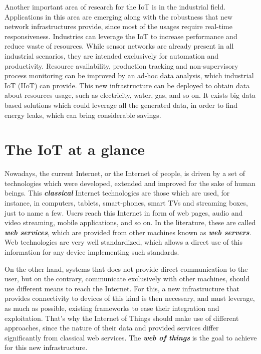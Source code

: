 Another important area of research for the IoT is in the industrial field\cite{lidaxu2014iiotsurvey}.
Applications in this area are emerging along with the robustness that new network infrastructures provide, since most of the usages require real-time responsiveness.
Industries can leverage the IoT to increase performance and reduce waste of resources.
While sensor networks are already present in all industrial scenarios, they are intended exclusively for automation and productivity.
Resource availability, production tracking and non-supervisory process monitoring can be improved by an ad-hoc data analysis, which industrial IoT (IIoT) can provide.
This new infrastructure can be deployed to obtain data about resources usage, such as electricity, water, gas, and so on.
It exists big data based solutions which could leverage all the generated data, in order to find energy leaks, which can bring considerable savings. 



\section{The IoT at a glance}
Nowadays, the current Internet, or the Internet of people, is driven by a set of technologies which were developed, extended and improved for the sake of human beings.
This \textit{\textbf{classical}} Internet technologies are those which are used, for instance, in computers, tablets, smart-phones, smart TVs and streaming boxes, just to name a few.
Users reach this Internet in form of web pages, audio and video streaming, mobile applications, and so on.
In the literature, these are called \textit{\textbf{web services}}, which are provided from other machines known as \textit{\textbf{web servers}}.
Web technologies are very well standardized, which allows a direct use of this information for any device implementing such standards.

On the other hand, systems that does not provide direct communication to the user, but on the contrary, communicate exclusively with other machines, should use different means to reach the Internet.
For this, a new infrastructure that provides connectivity to devices of this kind is then necessary, and must leverage, as much as possible, existing frameworks to ease their integration and exploitation.
That's why the Internet of Things should make use of different approaches, since the nature of their data and provided services differ  significantly from classical web services.
The \textit{\textbf{web of things}}\cite{duquennoy2009webofthings} is the goal to achieve for this new infrastructure.

